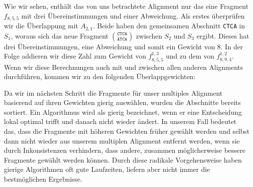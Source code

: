 Wie wir sehen, enthält das von uns betrachtete Alignment nur das eine Fragment $f_{8,5,5}$ mit drei Übereinstimmungen und einer Abweichung. Als erstes überprüfen wir die Überlappung mit $A_{2,1}$. Beide haben den gemeinsamen Abschnitt \texttt{CTCA} in $S_1$, woraus sich das neue Fragment ${\texttt{CTCA}}\choose{\texttt{ATCA}}$ zwischen $S_2$ und $S_3$ ergibt. Dieses hat drei Übereinstimmungen, eine Abweichung und somit ein Gewicht von 8. In der Folge addieren wir diese Zahl zum Gewicht von $f_{8,5,5}^{1,3}$ und zu dem von $f_{8,9,4}^{1,2}$. Wenn wir diese Berechnungen auch mit und zwischen allen anderen Alignments durchführen, kommen wir zu den folgenden Überlappgewichten:


Da wir im nächsten Schritt die Fragmente für unser multiples Alignment basierend auf ihren Gewichten gierig auswählen, wurden die Abschnitte bereits sortiert. Ein Algorithmus wird als gierig bezeichnet, wenn er eine Entscheidung lokal optimal trifft und danach nicht wieder ändert. In unserem Fall bedeutet das, dass die Fragmente mit höheren Gewichten früher gewählt werden und selbst dann nicht wieder aus unserem multiplen Alignment entfernt werden, wenn sie durch Inkonsistenzen verhindern, dass andere, zusammen möglicherweise bessere Fragmente gewählt werden können. Durch diese radikale Vorgehensweise haben gierige Algorithmen oft gute Laufzeiten, liefern aber nicht immer die bestmöglichen Ergebnisse.

